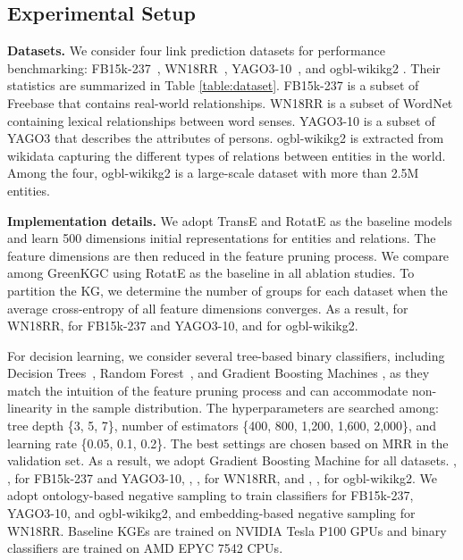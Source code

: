 \documentclass{article}
\begin{document}
\subsection{Experimental Setup}

{\bf Datasets.} We consider four link prediction datasets for 
performance benchmarking: FB15k-237~\citep{bordes2013translating,
toutanova2015observed}, WN18RR~\citep{bordes2013translating,
dettmers2018convolutional}, YAGO3-10~\citep{dettmers2018convolutional},
and ogbl-wikikg2 \citep{hu2020open}.
Their statistics are summarized in Table \ref{table:dataset}. 
FB15k-237 is a subset of Freebase
\citep{bollacker2008freebase} that contains real-world relationships.
WN18RR is a subset of WordNet \citep{miller1995wordnet} containing
lexical relationships between word senses. YAGO3-10 is a subset of YAGO3
\citep{mahdisoltani2014yago3} that describes the attributes of persons.
ogbl-wikikg2 is extracted from wikidata \citep{vrandevcic2014wikidata}
capturing the different types of relations between entities in the world.
Among the four, ogbl-wikikg2 is a large-scale dataset with more than 2.5M
entities.

{\bf Implementation details.} We adopt TransE \citep{bordes2013translating} 
and RotatE \citep{sun2018rotate} as the baseline models and learn 500 
dimensions initial representations for entities and relations. The feature
dimensions are then reduced in the feature pruning process.
We compare among GreenKGC using RotatE as the baseline in all ablation studies.
To partition the KG, we determine the number of groups  for each dataset
when the average cross-entropy of all feature dimensions converges. As a result,
 for WN18RR,  for FB15k-237 and YAGO3-10, and  for ogbl-wikikg2.

For decision learning, we consider several tree-based binary classifiers, 
including Decision Trees~\citep{breiman2017classification}, 
Random Forest~\citep{breiman2001random}, and Gradient Boosting Machines 
\citep{chen2016xgboost}, as they match the intuition of the feature 
pruning process and can accommodate non-linearity in the sample
distribution. The hyperparameters are searched among: 
tree depth  \{3, 5, 7\}, number of estimators  \{400, 800,
1,200, 1,600, 2,000\}, and learning rate  \{0.05, 0.1, 
0.2\}. The best settings are chosen based on MRR in the validation set. As 
a result, we adopt Gradient Boosting Machine for all datasets. 
, ,  for FB15k-237 and YAGO3-10, 
, ,  for WN18RR, and , , 
 for ogbl-wikikg2. We adopt ontology-based
negative sampling to train classifiers for FB15k-237, YAGO3-10, 
and ogbl-wikikg2, and embedding-based negative sampling for WN18RR. 
Baseline KGEs are trained on NVIDIA Tesla P100 GPUs and binary 
classifiers are trained on AMD EPYC 7542 CPUs.
\end{document}
